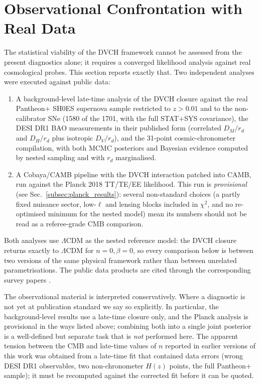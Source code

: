 \documentclass[pdflatex,sn-mathphys-num]{sn-jnl}%
\begin{document}
\section{Observational Confrontation with Real Data}
\label{sec:results}

The statistical viability of the DVCH framework cannot be assessed from the
present diagnostics alone; it requires a converged likelihood analysis
against real cosmological probes. This section reports exactly that. Two
independent analyses were executed against public data:

\begin{enumerate}
    \item A background-level late-time analysis of the DVCH closure against the
    real Pantheon$+$ SH0ES supernova sample restricted to $z>0.01$ and to the
    non-calibrator SNe (1580 of the 1701, with the full STAT$+$SYS covariance),
    the DESI DR1 BAO measurements in their published form (correlated
    $D_M/r_d$ and $D_H/r_d$ plus isotropic $D_V/r_d$), and the 31-point
    cosmic-chronometer compilation, with both MCMC posteriors and Bayesian
    evidence computed by nested sampling and with $r_d$ marginalised.
    \item A Cobaya/CAMB pipeline with the DVCH interaction patched into
    CAMB, run against the Planck 2018 TT/TE/EE likelihood. This run is
    \emph{provisional} (see Sec.~\ref{subsec:planck_results}): several
    non-standard choices (a partly fixed nuisance sector, low-$\ell$ and
    lensing blocks included in $\chi^2$, and no re-optimised minimum for
    the nested model) mean its numbers should not be read as a
    referee-grade CMB comparison.
\end{enumerate}

Both analyses use $\Lambda$CDM as the nested reference model: the DVCH
closure returns exactly to $\Lambda$CDM for $n=0,\beta=0$, so every
comparison below is between two versions of the same physical framework
rather than between unrelated parametrisations. The public data products are
cited through the corresponding survey papers
\cite{Aghanim:2018eyx,Planck:2019nip,Adame:2024ywp,Brout2022,Moresco:2016mzx}.

The observational material is interpreted conservatively. Where a diagnostic
is not yet at publication standard we say so explicitly. In particular, the
background-level results use a late-time closure only, and the Planck
analysis is provisional in the ways listed above; combining both into a
single joint posterior is a well-defined but separate task that is
\emph{not} performed here. The apparent tension between the CMB and
late-time values of $n$ reported in earlier versions of this work was
obtained from a late-time fit that contained data errors (wrong DESI DR1
observables, two non-chronometer $H(z)$ points, the full Pantheon$+$
sample); it must be recomputed against the corrected fit before it can be
quoted.
\end{document}
